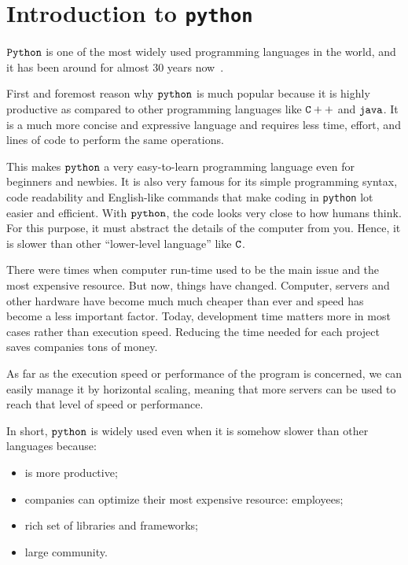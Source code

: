 \chapter{Introduction to \texttt{python}}\label{introduction-to-python---lesson-1}

$\tt{Python}$ is one of the most widely used programming languages in the world, and it has been around for almost 30 years now~\cite{survey2019}.

First and foremost reason why $\tt{python}$ is much popular because it is highly productive as compared to other programming languages like $\tt{C++}$ and $\tt{java}$. It is a much more concise and expressive language and requires less time, effort, and lines of code to perform the same operations.

This makes $\tt{python}$ a very easy-to-learn programming language even for beginners and newbies. It is also very famous for its simple programming syntax, code readability and English-like commands that make coding in \texttt{python} lot easier and efficient.
With $\tt{python}$, the code looks very close to how humans think. For this purpose, it must abstract the details of the computer from you. Hence, it is slower than other “lower-level language” like $\tt{C}$.

There were times when computer run-time used to be the main issue and the most expensive resource. But now, things have changed. Computer, servers and other hardware have become much much cheaper than ever and speed has become a less important factor. Today, development time matters more in most cases rather than execution speed. Reducing the time needed for each project saves companies tons of money.

As far as the execution speed or performance of the program is concerned, we can easily manage it by horizontal scaling, meaning that more servers can be used to reach that level of speed or performance.

In short, $\tt{python}$ is widely used even when it is somehow slower than other languages because:
\begin{itemize}
	\tightlist
  \item is more productive;
  \item companies can optimize their most expensive resource: employees;
  \item rich set of libraries and frameworks;
  \item large community.
\end{itemize}

